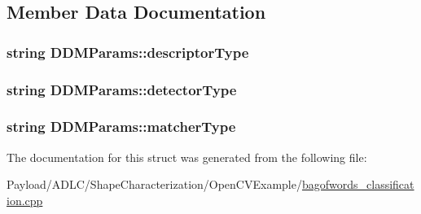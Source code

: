 \subsection{Member Data Documentation}
\hypertarget{structDDMParams_acd9a38edfafc783a97a4ede7337b48d7}{
\subsubsection[{descriptor\-Type}]{\setlength{\rightskip}{0pt plus 5cm}string D\-D\-M\-Params\-::descriptor\-Type}}\label{structDDMParams_acd9a38edfafc783a97a4ede7337b48d7}
\hypertarget{structDDMParams_a7a13119000263119c574f88b11f3f9a6}{
\subsubsection[{detector\-Type}]{\setlength{\rightskip}{0pt plus 5cm}string D\-D\-M\-Params\-::detector\-Type}}\label{structDDMParams_a7a13119000263119c574f88b11f3f9a6}
\hypertarget{structDDMParams_abc008f2603cebb2aff44945b0a4f66a5}{
\subsubsection[{matcher\-Type}]{\setlength{\rightskip}{0pt plus 5cm}string D\-D\-M\-Params\-::matcher\-Type}}\label{structDDMParams_abc008f2603cebb2aff44945b0a4f66a5}


The documentation for this struct was generated from the following file\-:\begin{DoxyCompactItemize}
\item 
Payload/\-A\-D\-L\-C/\-Shape\-Characterization/\-Open\-C\-V\-Example/\hyperlink{bagofwords__classification_8cpp}{bagofwords\-\_\-classification.\-cpp}\end{DoxyCompactItemize}
